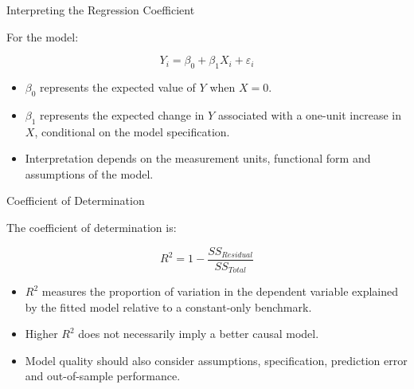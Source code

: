 \documentclass{beamer}
\begin{document}
\begin{frame}{Interpreting the Regression Coefficient}

For the model:

\[
Y_i =
\beta_0 +
\beta_1X_i+
\varepsilon_i
\]

\vskip 0.5cm

\begin{itemize}

  \item $\beta_0$ represents the expected value of $Y$ when $X=0$.

  \vskip 0.3cm

  \item $\beta_1$ represents the expected change in $Y$ associated with a one-unit increase in $X$, conditional on the model specification.

  \vskip 0.4cm

  \item Interpretation depends on the measurement units, functional form and assumptions of the model.

\end{itemize}

\end{frame}


\begin{frame}{Coefficient of Determination}

The coefficient of determination is:

\vskip 0.5cm

\[
R^2 =
1 -
\frac{SS_{Residual}}
{SS_{Total}}
\]

\vskip 0.5cm

\begin{itemize}

  \item $R^2$ measures the proportion of variation in the dependent variable explained by the fitted model relative to a constant-only benchmark.

  \vskip 0.3cm

  \item Higher $R^2$ does not necessarily imply a better causal model.

  \vskip 0.3cm

  \item Model quality should also consider assumptions, specification, prediction error and out-of-sample performance.

\end{itemize}

\end{frame}
\end{document}
